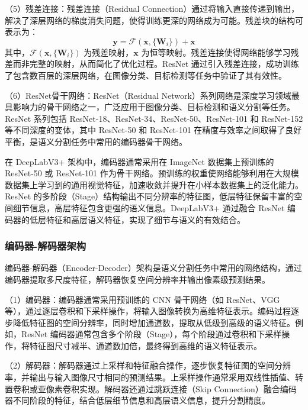 （5）残差连接：残差连接（Residual Connection）通过将输入直接传递到输出，解决了深层网络的梯度消失问题，使得训练更深的网络成为可能。残差块的结构可表示为：
\begin{equation}
\mathbf{y} = \mathcal{F}(\mathbf{x}, \{\mathbf{W}_i\}) + \mathbf{x}
\label{eq:residual}
\end{equation}
其中，$\mathcal{F}(\mathbf{x}, \{\mathbf{W}_i\})$ 为残差映射，$\mathbf{x}$ 为恒等映射。残差连接使得网络能够学习残差而非完整的映射，从而简化了优化过程。ResNet 通过引入残差连接，成功训练了包含数百层的深层网络，在图像分类、目标检测等任务中验证了其有效性。

（6）ResNet骨干网络：ResNet（Residual Network）系列网络是深度学习领域最具影响力的骨干网络之一，广泛应用于图像分类、目标检测和语义分割等任务。ResNet 系列包括 ResNet-18、ResNet-34、ResNet-50、ResNet-101 和 ResNet-152 等不同深度的变体，其中 ResNet-50 和 ResNet-101 在精度与效率之间取得了良好平衡，是语义分割任务中常用的编码器骨干网络。

在 DeepLabV3+ 架构中，编码器通常采用在 ImageNet 数据集上预训练的 ResNet-50 或 ResNet-101 作为骨干网络。预训练的权重使网络能够利用在大规模数据集上学习到的通用视觉特征，加速收敛并提升在小样本数据集上的泛化能力。ResNet 的多阶段（Stage）结构输出不同分辨率的特征图，低层特征保留丰富的空间细节信息，高层特征包含更强的语义信息。DeepLabV3+ 通过融合 ResNet 编码器的低层特征和高层语义特征，实现了细节与语义的有效结合。

\subsubsection{编码器-解码器架构}

编码器-解码器（Encoder-Decoder）架构是语义分割任务中常用的网络结构，通过编码器提取多尺度特征，解码器恢复空间分辨率并输出像素级预测结果。

（1）编码器：编码器通常采用预训练的 CNN 骨干网络（如 ResNet、VGG 等），通过逐层卷积和下采样操作，将输入图像转换为高维特征表示。编码过程逐步降低特征图的空间分辨率，同时增加通道数，提取从低级到高级的语义特征。例如，ResNet 编码器通常包含多个阶段（Stage），每个阶段通过卷积和下采样操作，将特征图尺寸减半、通道数加倍，最终得到高维的语义特征表示。

（2）解码器：解码器通过上采样和特征融合操作，逐步恢复特征图的空间分辨率，并输出与输入图像尺寸相同的预测结果。上采样操作通常采用双线性插值、转置卷积或亚像素卷积实现。解码器还通过跳跃连接（Skip Connection）融合编码器不同阶段的特征，结合低层细节信息和高层语义信息，提升分割精度。

